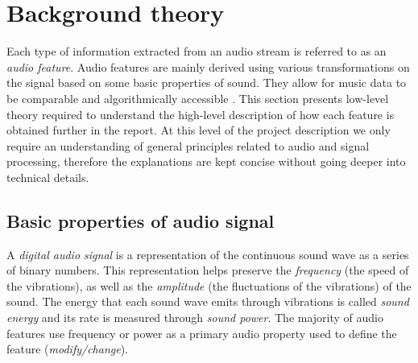 
\chapter{Background theory}
\label{chap:relatedterms}
\ifpdf
    \graphicspath{{RelatedTerminology/Figures/PNG/}{RelatedTerminology/Figures/PDF/}{RelatedTerminology/Figures/}}
\else
    \graphicspath{{RelatedTerminology/Figures/EPS/}{RelatedTerminology/Figures/}}
\fi



%

Each type of information extracted from an audio stream is referred to as an
\textit{audio feature}. Audio features are mainly derived using various
transformations on the signal based on some basic properties of sound. They
allow for music data to be comparable and algorithmically accessible
\cite{mullershort}. This section presents low-level theory required to
understand the high-level description of how each feature is obtained further in
the report. At this level of the project description we only require an
understanding of general principles related to audio and signal processing,
therefore the explanations are kept concise without going deeper into technical
details.


\section{Basic properties of audio signal}
\label{sec:audioprops}
A \textit{digital audio signal} is a representation of the continuous sound wave
as a series of binary numbers. This representation helps preserve the
\textit{frequency} (the speed of the vibrations), as well as the
\textit{amplitude} (the fluctuations of the vibrations) of the sound. The energy
that each sound wave emits through vibrations is called \textit{sound energy}
and its rate is measured through \textit{sound power}. The majority of audio
features use frequency or power as a primary audio property used to define the
feature (\textit{modify/change}). 

